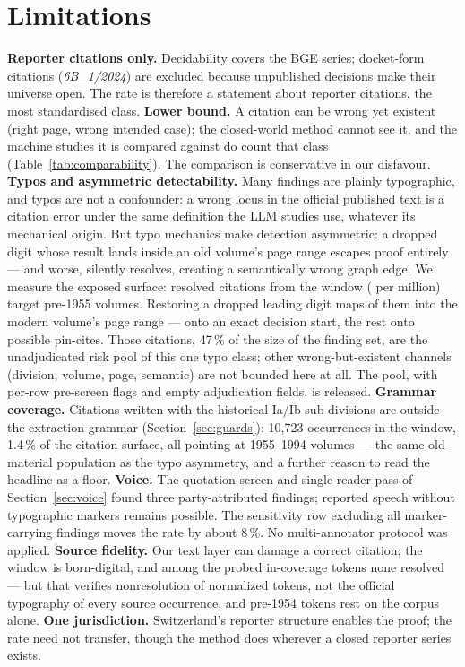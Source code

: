 \documentclass[11pt,a4paper]{article}
\begin{document}
\section{Limitations}\label{sec:limits}

\textbf{Reporter citations only.} Decidability covers the BGE series;
docket-form citations (\emph{6B\_1/2024}) are excluded because
unpublished decisions make their universe open. The rate is therefore a
statement about reporter citations, the most standardised class.
\textbf{Lower bound.} A citation can be wrong yet existent (right page,
wrong intended case); the closed-world method cannot see it, and the
machine studies it is compared against do count that class
(Table~\ref{tab:comparability}). The comparison is conservative in our
disfavour.
\textbf{Typos and asymmetric detectability.} Many findings are plainly
typographic, and typos are not a confounder: a wrong locus in the
official published text is a citation error under the same definition
the LLM studies use, whatever its mechanical origin. But typo mechanics
make detection asymmetric: a dropped digit whose result lands inside an
old volume's page range escapes proof entirely --- and worse, silently
resolves, creating a semantically wrong graph edge. We measure the
exposed surface: \NPoolPre{} resolved citations from the window
(\PoolPpm{} per million) target pre-1955 volumes. Restoring a dropped
leading digit maps \NPoolPlausible{} of them into the modern volume's
page range --- \NPoolStart{} onto an exact decision start, the rest
onto possible pin-cites. Those \NPoolPlausible{} citations, 47\,\% of
the size of the finding set, are the unadjudicated risk pool of this
one typo class; other wrong-but-existent channels (division, volume,
page, semantic) are not bounded here at all. The pool, with per-row
pre-screen flags and empty adjudication fields, is released.
\textbf{Grammar coverage.} Citations written with the historical Ia/Ib
sub-divisions are outside the extraction grammar
(Section~\ref{sec:guards}): 10{,}723 occurrences in the window, 1.4\,\%
of the citation surface, all pointing at 1955--1994 volumes --- the
same old-material population as the typo asymmetry, and a further
reason to read the headline as a floor.
\textbf{Voice.} The quotation screen and single-reader pass of
Section~\ref{sec:voice} found three party-attributed findings;
reported speech without typographic markers remains possible. The
sensitivity row excluding all marker-carrying findings moves the rate
by about 8\,\%. No multi-annotator protocol was applied.
\textbf{Source fidelity.} Our text layer can damage a correct
citation; the window is born-digital, and among the \NProbeConfirmed{}
probed in-coverage tokens none resolved --- but that verifies
nonresolution of normalized tokens, not the official typography of
every source occurrence, and pre-1954 tokens rest on the corpus
alone.
\textbf{One jurisdiction.} Switzerland's reporter structure enables the
proof; the rate need not transfer, though the method does wherever a
closed reporter series exists.
\end{document}
